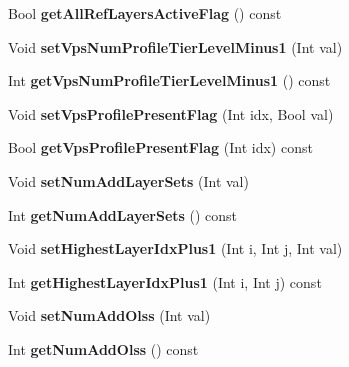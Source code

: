 \begin{DoxyCompactItemize}
Bool {\bfseries get\+All\+Ref\+Layers\+Active\+Flag} () const
\item 
\mbox{\label{class_t_com_v_p_s_a0c0f605368547ddc9b6084b9f2a31f64}} 
Void {\bfseries set\+Vps\+Num\+Profile\+Tier\+Level\+Minus1} (Int val)
\item 
\mbox{\label{class_t_com_v_p_s_abc2e7ac5553fd6464706959aa2d7d47c}} 
Int {\bfseries get\+Vps\+Num\+Profile\+Tier\+Level\+Minus1} () const
\item 
\mbox{\label{class_t_com_v_p_s_a1268a365311c45136660817ef6c283f7}} 
Void {\bfseries set\+Vps\+Profile\+Present\+Flag} (Int idx, Bool val)
\item 
\mbox{\label{class_t_com_v_p_s_a6d784e5f24fe07c1d88588c5b05455b1}} 
Bool {\bfseries get\+Vps\+Profile\+Present\+Flag} (Int idx) const
\item 
\mbox{\label{class_t_com_v_p_s_a506de30786df0638f46de3483f1e9c9e}} 
Void {\bfseries set\+Num\+Add\+Layer\+Sets} (Int val)
\item 
\mbox{\label{class_t_com_v_p_s_a9412670984719782b10e768e9011bccc}} 
Int {\bfseries get\+Num\+Add\+Layer\+Sets} () const
\item 
\mbox{\label{class_t_com_v_p_s_afc5844e789ad5f5e4b68a4b7dd9fc045}} 
Void {\bfseries set\+Highest\+Layer\+Idx\+Plus1} (Int i, Int j, Int val)
\item 
\mbox{\label{class_t_com_v_p_s_aefe1f8cefcfc10f9d90d77d8dadffe4a}} 
Int {\bfseries get\+Highest\+Layer\+Idx\+Plus1} (Int i, Int j) const
\item 
\mbox{\label{class_t_com_v_p_s_abb75e72a1d1333fe9c03bc2f01d20faf}} 
Void {\bfseries set\+Num\+Add\+Olss} (Int val)
\item 
\mbox{\label{class_t_com_v_p_s_a6a85487b63ec9f9cf160c38860d5c492}} 
Int {\bfseries get\+Num\+Add\+Olss} () const
\item 
\mbox{\label{class_t_com_v_p_s_a24305bac4a4d2ad0fe2535b64cfef065}} 

\end{DoxyCompactItemize}
